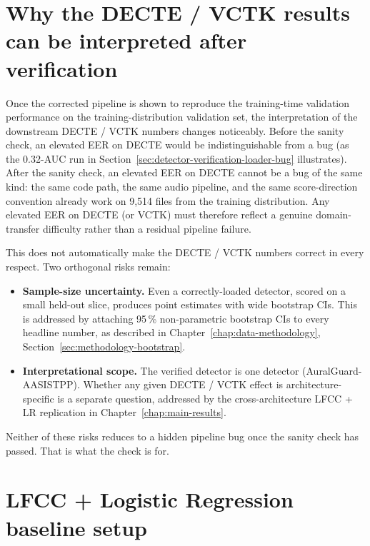 \section{Why the DECTE / VCTK results can be interpreted after verification}
\label{sec:detector-verification-interpretation}

Once the corrected pipeline is shown to reproduce the
training-time validation performance on the training-distribution
validation set, the interpretation of the downstream DECTE / VCTK
numbers changes noticeably. Before the sanity check, an elevated
EER on DECTE would be indistinguishable from a bug (as the
0.32-AUC run in Section~\ref{sec:detector-verification-loader-bug}
illustrates). After the sanity check, an elevated EER on DECTE
cannot be a bug of the same kind: the same code path, the same
audio pipeline, and the same score-direction convention already
work on 9,514 files from the training distribution. Any elevated
EER on DECTE (or VCTK) must therefore reflect a genuine
domain-transfer difficulty rather than a residual pipeline failure.

This does not automatically make the DECTE / VCTK numbers correct
in every respect. Two orthogonal risks remain:

\begin{itemize}
    \item \textbf{Sample-size uncertainty.} Even a correctly-loaded detector,
        scored on a small held-out slice, produces point estimates with
        wide bootstrap CIs. This is addressed by attaching 95\,\%
        non-parametric bootstrap CIs to every headline number, as
        described in Chapter~\ref{chap:data-methodology},
        Section~\ref{sec:methodology-bootstrap}.
    \item \textbf{Interpretational scope.} The verified detector is one
        detector (AuralGuard-AASISTPP). Whether any given DECTE / VCTK
        effect is architecture-specific is a separate question,
        addressed by the cross-architecture LFCC + LR replication
        in Chapter~\ref{chap:main-results}.
\end{itemize}

Neither of these risks reduces to a hidden pipeline bug once the
sanity check has passed. That is what the check is for.


\section{LFCC + Logistic Regression baseline setup}
\label{sec:detector-verification-lfcc}

